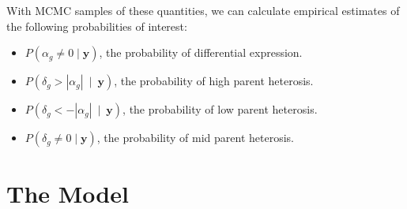 \documentclass{article}\usepackage{graphicx, color}
\providecommand{\vc}[1]{\boldsymbol{#1}}
\begin{document}
\begin{flushleft}
With MCMC samples of these quantities, we can calculate empirical estimates of the following probabilities of interest:

\begin{itemize}
\item $P(\alpha_g \ne 0 \mid \vc{y})$, the probability of differential expression.
\item $P(\delta_g > |\alpha_g| \ \mid \ \vc{y}) $, the probability of high parent heterosis.
\item $P(\delta_g < -|\alpha_g| \ \mid \ \vc{y})$, the probability of low parent heterosis.
\item $P(\delta_g \ne 0 \mid \vc{y})$, the probability of mid parent heterosis.
\end{itemize}

\section{The Model} \label{sec:model}


\end{flushleft}
\end{document}
